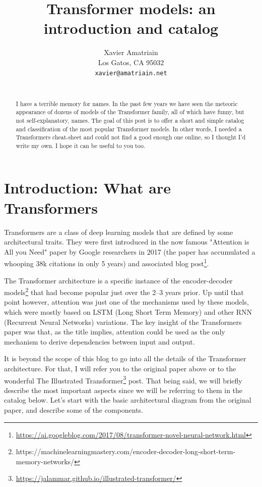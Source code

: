 \documentclass{article}
\title{Transformer models: an introduction and catalog}
\author{
 Xavier Amatriain \\
  Los Gatos, CA 95032 \\
  \texttt{xavier@amatriain.net} \\
 \\
}
\begin{document}
\maketitle
\begin{abstract}
I have a terrible memory for names. In the past few years we have seen the meteoric appearance of dozens of models of the Transformer family, all of which have funny, but not self-explanatory, names. The goal of this post is to offer a short and simple catalog and classification of the most popular Transformer models. In other words, I needed a Transformers cheat-sheet and could not find a good enough one online, so I thought I’d write my own. I hope it can be useful to you too.
\end{abstract}

\tableofcontents



\section{Introduction: What are Transformers}

Transformers are a class of deep learning models that are defined by some architectural traits. They were first introduced in the now famous "Attention is All you Need" paper by Google researchers in 2017 \cite{vaswani2017attention} (the paper has accumulated a whooping 38k citations in only 5 years) and associated blog post\footnote{\url{https://ai.googleblog.com/2017/08/transformer-novel-neural-network.html}}.

The Transformer architecture is a specific instance of the encoder-decoder models\cite{cho2014properties}\footnote{https://machinelearningmastery.com/encoder-decoder-long-short-term-memory-networks/} that had become popular just over the 2–3 years prior. Up until that point however, attention was just one of the mechanisms used by these models, which were mostly based on LSTM (Long Short Term Memory)\cite{hochreiter1997long} and other RNN (Recurrent Neural Networks)\cite{mikolov2010recurrent} variations. The key insight of the Transformers paper was that, as the title implies, attention could be used as the only mechanism to derive dependencies between input and output.

It is beyond the scope of this blog to go into all the details of the Transformer architecture. For that, I will refer you to the original paper above or to the wonderful The Illustrated Transformer\footnote{\url{https://jalammar.github.io/illustrated-transformer/}} post. That being said, we will briefly describe the most important aspects since we will be referring to them in the catalog below. Let’s start with the basic architectural diagram from the original paper, and describe some of the components.
\end{document}

